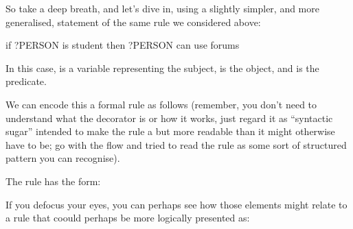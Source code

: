 \documentclass[letterpaper,10pt,english]{sphinxmanual}
\begin{document}
{So take a deep breath, and let’s dive in, using a slightly simpler, and more generalised, statement of the same rule we considered above:

\begin{sphinxVerbatim}[commandchars=\\\{\}]
if ?PERSON is student
    then ?PERSON can use forums
\end{sphinxVerbatim}

In this case,  is a variable representing the subject,  is the object, and  is the predicate.

We can encode this a formal rule as follows (remember, you don’t need to understand what the  decorator is or how it works, just regard it as “syntactic sugar” intended to make the rule a but more readable than it might otherwise have to be; go with the flow and tried to read the rule as some sort of structured pattern you can recognise).

\begin{sphinxVerbatim}[commandchars=\\\{\}]
 
 
      
\end{sphinxVerbatim}

The rule has the form:

\begin{sphinxVerbatim}[commandchars=\\\{\}]
 
\end{sphinxVerbatim}

If you defocus your eyes, you can perhaps see how those elements might relate to a rule that coould perhaps be more logically presented as:

\begin{sphinxVerbatim}[commandchars=\\\{\}]
     
   
\end{sphinxVerbatim}

}
\end{document}
